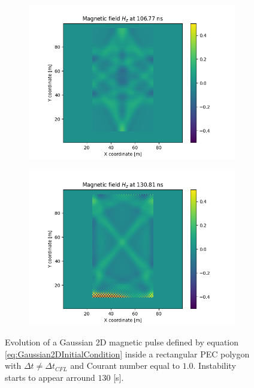 \documentclass[12pt, oneside]{book}
\begin{document}
\begin{figure}[h!]
    \begin{subfigure}[b]{0.49\textwidth}
        \centering
        \includegraphics[width=\textwidth]{Imagenes/CFDTD2D_GaussianInstability3.png}
    \end{subfigure}
    \begin{subfigure}[b]{0.49\textwidth}
        \centering
        \includegraphics[width=\textwidth]{Imagenes/CFDTD2D_GaussianInstability4.png}
    \end{subfigure}
    \caption{Evolution of a Gaussian 2D magnetic pulse defined by equation \ref{eq:Gaussian2DInitialCondition} inside a rectangular PEC polygon with $\Delta t \neq \Delta t_{CFL}$ and Courant number equal to $1.0$. Instability starts to appear arround $130$ [s].}
    \label{fig:CFDTD2D_GaussianInstability}
\end{figure}
\end{document}
